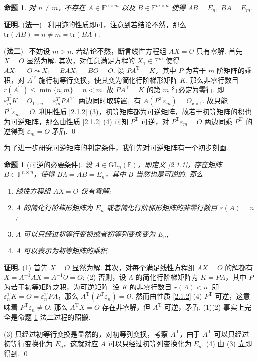 \documentclass[10pt,openany]{article}
\theoremstyle{thmstyle} %
\theoremstyle{defstyle} %
\theoremstyle{prostyle} %
\newtheorem{proposition}[theorem]{命题}
\theoremstyle{exastyle}
\theoremstyle{remstyle}
\renewenvironment{proof}[1][证明]{\par\underline{\textbf{#1.}} \;\fangsong}{\qed\par}
\newcommand{\T}{^{\text{T}}}
\newcommand{\F}{\mathbb{F}}
\newcommand{\gf}{\text{GL}_n(\mathbb{F})}
\newcommand{\n}{^{n \times n}}
\newcommand{\mn}{^{m \times n}}
\newcommand{\nm}{^{n \times m}}
\newcommand{\tr}{\mathrm{tr}}
\begin{document}
\begin{proposition}
	对 \( n \neq m \)，不存在 \( A \in \F\nm \) 以及 \( B \in \F\mn \) 使得 \( AB= E_n, \; BA=E_m \).
	\label{2.1.11}
\end{proposition}

\begin{proof}
	(\textbf{法一}) \ 利用迹的性质即可，注意到若结论不然，那么 \(\tr(AB)=n \neq m=\tr(BA) \).
	
	\vspace{1ex}
	
	(\textbf{法二}) \ 不妨设 \( m>n \). 若结论不然，断言线性方程组 \( AX=O \) 只有零解. 首先 \( X=O \) 显然为解. 其次，对任意满足方程的 \( X_1 \in \F^m \) 使得 \( AX_1=O \leadsto X_1=BAX_1=BO=O \). 设 \( PA\T=K \)，其中 \( P \) 为若干 \( m \) 阶矩阵的乘积，对 \( A\T \) 施行初等行变换，使其变为简化行阶梯形矩阵 \( K \). 那么非零行数目 \( r(A\T) \leq \min\{n,m\}=n<m \). 故 \( PA\T=K \) 的第 \( m \) 行必定为零行. 即 \( \varepsilon_m^T K= O_{1 \times n}= \varepsilon_m^T PA\T \). 两边同时取转置，有 \( A(P\T\varepsilon_m)=O_{n \times 1} \). 故只能 \( P\T\varepsilon_m=O \). 利用性质 \ref{2.1.2} (3)，初等矩阵都为可逆矩阵，故若干初等矩阵的积也为可逆矩阵，那么由性质 \ref{2.1.2} (4) 可知 \( P\T \) 可逆，对  \( P\T\varepsilon_m=O \) 两边同乘 \( P\T \) 的逆得到 \( \varepsilon_m=O \) 矛盾.
\end{proof}

为了进一步研究可逆矩阵的判定条件，我们先对可逆矩阵有一个初步刻画.

\begin{proposition}[可逆的必要条件]
	设 \( A \in \gf \)，即定义 \ref{2.1.1}，存在矩阵 \( B \in \F\n \)，使得 \( BA=AB=E_n \)，其中 \( B \) 当然也是可逆的. 那么
	\begin{enumerate}[(1)]
		\item 线性方程组 \( AX=O \) 仅有零解;
		\item \( A \) 的简化行阶梯形矩阵为 \( E_n \) 或者简化行阶梯形矩阵的非零行数目 \( r(A)=n \);
		\item \( A \) 可以只经过初等行变换或者初等列变换变为 \( E_n \);
		\item \( A \) 可以表示为初等矩阵的乘积.
	\end{enumerate}
	\label{2.1.12}
\end{proposition}

\begin{proof}
	(1) 首先 \( X=O \) 显然为解. 其次，对每个满足线性方程组 \( AX=O \) 的解都有 \( X=A^{-1}AX=A^{-1}O=O \);
	(2) 否则，设 \( A \) 的简化行阶梯矩阵为 \( K=PA \)，其中 \( P \) 为若干初等矩阵之积，为可逆矩阵. 设 \( K \) 的非零行数目 \( r(A)<n \). 即 \( \varepsilon_n\T K=O= \varepsilon_n\T PA \)，那么 \( A\T(P\T \varepsilon_n)=O \). 然而由性质 \ref{2.1.2} (4) \( P\T \) 可逆，这意味着 \( P\T \varepsilon_n \neq O \). 那么 \( A\T X=O \) 存在非零解，但 \( A\T \) 可逆，矛盾. (1)(2) 事实上完全是命题 \ref{2.1.11} 法二过程的照搬.
	
	\vspace{1ex}
	
    (3) 只经过初等行变换是显然的，对初等列变换，考察 \( A\T \)，由于 \( A\T \) 可以只经过初等行变换化为 \( E_n \)，这就对应 \( A \) 可以只经过初等列变换化为 \( E_n \). (4) 由 (3) 立即得到.
\end{proof}
\end{document}
